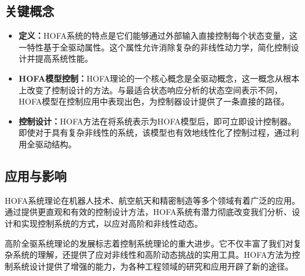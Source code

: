 \subsection*{关键概念}

\begin{itemize}
    \item \textbf{定义：}HOFA系统的特点是它们能够通过外部输入直接控制每个状态变量，这一特性基于全驱动属性。这个属性允许消除复杂的非线性动力学，简化控制设计并提高系统性能。
    
    \item \textbf{HOFA模型控制：}HOFA理论的一个核心概念是全驱动概念，这一概念从根本上改变了控制设计的方法。与最适合状态响应分析的状态空间表示不同，HOFA模型在控制应用中表现出色，为控制器设计提供了一条直接的路径。
    
    \item \textbf{控制设计：}HOFA方法在将系统表示为HOFA模型后，即可立即设计控制器。即使对于具有复杂非线性的系统，该模型也有效地线性化了控制过程，通过利用全驱动结构。
\end{itemize}

\subsection*{应用与影响}

HOFA系统理论在机器人技术、航空航天和精密制造等多个领域有着广泛的应用。通过提供更直观和有效的控制设计方法，HOFA系统有潜力彻底改变我们分析、设计和实现控制系统的方式，以应对高阶和非线性动态。

高阶全驱系统理论的发展标志着控制系统理论的重大进步。它不仅丰富了我们对复杂系统的理解，还提供了应对非线性和高阶动态挑战的实用工具。HOFA方法为控制系统设计提供了增强的能力，为各种工程领域的研究和应用开辟了新的途径。

\newpage
